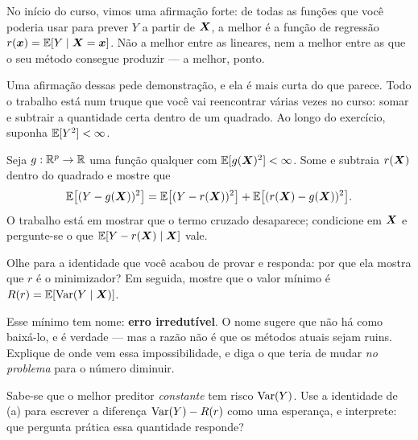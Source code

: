 No início do curso, vimos uma afirmação forte: de todas as funções que você poderia usar
para prever $Y$ a partir de $\bm{X}$, a melhor é a função de regressão
$r(\bm{x})=\mathbb{E}[Y\mid\bm{X}=\bm{x}]$. Não a melhor entre as lineares, nem a melhor entre as que
o seu método consegue produzir --- a melhor, ponto.

Uma afirmação dessas pede demonstração, e ela é mais curta do que parece. Todo o
trabalho está num truque que você vai reencontrar várias vezes no curso: somar e
subtrair a quantidade certa dentro de um quadrado. Ao longo do exercício, suponha
$\mathbb{E}[Y^2]<\infty$.
\begin{itens}
  \item {} Seja $g:\mathbb{R}^p\to\mathbb{R}$ uma função qualquer com
        $\mathbb{E}[g(\bm{X})^2]<\infty$. Some e subtraia $r(\bm{X})$ dentro do quadrado e mostre
        que
        \[
          \mathbb{E}\big[(Y-g(\bm{X}))^2\big]
            = \mathbb{E}\big[(Y-r(\bm{X}))^2\big] + \mathbb{E}\big[(r(\bm{X})-g(\bm{X}))^2\big].
        \]
        O trabalho está em mostrar que o termo cruzado desaparece; condicione em
        $\bm{X}$ e pergunte-se o que $\mathbb{E}[Y-r(\bm{X})\mid\bm{X}]$ vale.
  \item {} Olhe para a identidade que você acabou de provar e responda: por
        que ela mostra que $r$ é o minimizador? Em seguida, mostre que o valor
        mínimo é $R(r)=\mathbb{E}[\operatorname{Var}(Y\mid\bm{X})]$.
  \item {} Esse mínimo tem nome: \textbf{erro irredutível}. O nome sugere
        que não há como baixá-lo, e é verdade --- mas a razão não é que os métodos
        atuais sejam ruins. Explique de onde vem essa impossibilidade, e diga o que
        teria de mudar \emph{no problema} para o número diminuir.
  \item {} Sabe-se que o melhor preditor \emph{constante} tem risco
        $\operatorname{Var}(Y)$. Use a identidade de (a) para escrever
        a diferença $\operatorname{Var}(Y)-R(r)$ como uma esperança, e interprete: que
        pergunta prática essa quantidade responde?
\end{itens}

